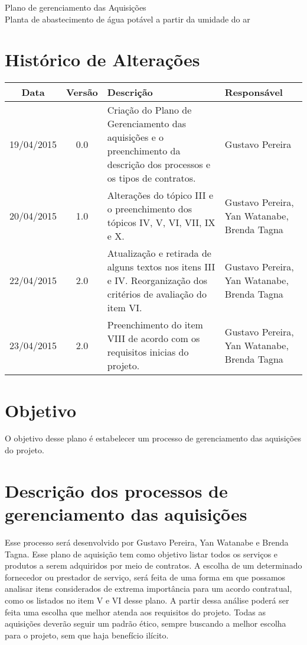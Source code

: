 \documentclass[12pt,openright,oneside,a4paper,brazil]{abntex2}
\title{}
\author{}
\begin{document}
\textual
\begin{center}
 {\large Plano de gerenciamento das Aquisições}\\[0.2cm]
 {Planta de abastecimento de água potável a partir da umidade do ar}\\
 \end{center}
 
 \section{Histórico de Alterações}
\begin{table}[h]
\centering
\begin{tabular}{|c|c|p{6cm}|p{5cm}|}

Data & Versão & Descrição & Responsável\\
\hline                               
19/04/2015 & 0.0 & Criação do Plano de Gerenciamento das aquisições e o preenchimento da descrição dos processos e os tipos de contratos. & Gustavo Pereira\\
\hline
20/04/2015 & 1.0 & Alterações do tópico III e o preenchimento dos tópicos IV, V, VI, VII, IX e X. & Gustavo Pereira, Yan Watanabe, Brenda Tagna\\
\hline
22/04/2015 & 2.0 & Atualização e retirada de alguns textos nos itens III e IV. Reorganização dos critérios de avaliação do item VI. & Gustavo Pereira, Yan Watanabe, Brenda Tagna\\
\hline
23/04/2015 & 2.0 & Preenchimento do item VIII de acordo com os requisitos inicias do projeto. & Gustavo Pereira, Yan Watanabe, Brenda Tagna\\
\hline
\end{tabular}
\end{table}

\section{Objetivo}
  O objetivo desse plano é estabelecer um processo de gerenciamento das aquisições do projeto.
  
\section{Descrição dos processos de gerenciamento das aquisições}
  Esse processo será desenvolvido por Gustavo Pereira, Yan Watanabe e Brenda Tagna. Esse plano de aquisição tem como objetivo listar todos os serviços e produtos a serem adquiridos por meio de contratos. 
A escolha de um determinado fornecedor ou prestador de serviço, será feita de uma forma em que possamos analisar itens considerados de extrema importância para um acordo contratual, como os listados no item V e VI desse plano. A partir dessa análise poderá ser feita uma escolha que melhor atenda aos requisitos do projeto. 
Todas as aquisições deverão seguir um padrão ético, sempre buscando a melhor escolha para o projeto, sem que haja benefício ilícito. 
\end{document}
